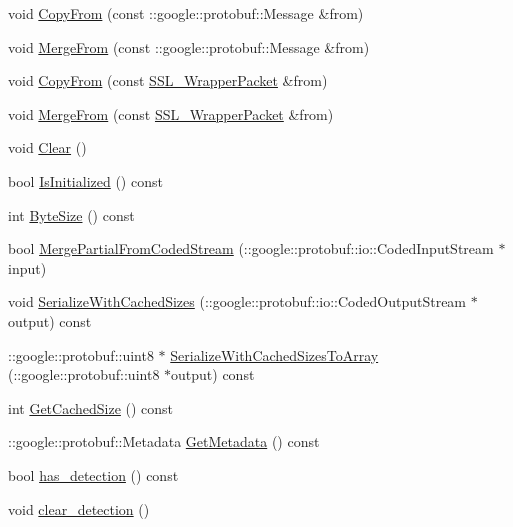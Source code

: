 \begin{DoxyCompactItemize}
\item 
void \hyperlink{class_s_s_l___wrapper_packet_a3598bad0c735e7936e1e8bfbe7ce1139}{Copy\-From} (const \-::google\-::protobuf\-::\-Message \&from)
\item 
void \hyperlink{class_s_s_l___wrapper_packet_ad83ac8173a8de6b17e3a27ae9d25594a}{Merge\-From} (const \-::google\-::protobuf\-::\-Message \&from)
\item 
void \hyperlink{class_s_s_l___wrapper_packet_a91e54235d684a97ae9cc27e499440466}{Copy\-From} (const \hyperlink{class_s_s_l___wrapper_packet}{S\-S\-L\-\_\-\-Wrapper\-Packet} \&from)
\item 
void \hyperlink{class_s_s_l___wrapper_packet_a98cd44b6a6067c67fbc8bed126e3f3e8}{Merge\-From} (const \hyperlink{class_s_s_l___wrapper_packet}{S\-S\-L\-\_\-\-Wrapper\-Packet} \&from)
\item 
void \hyperlink{class_s_s_l___wrapper_packet_aed15545de01822088f86589e1581a7aa}{Clear} ()
\item 
bool \hyperlink{class_s_s_l___wrapper_packet_a9d21830755ed4faf4423ffe80c5e459e}{Is\-Initialized} () const 
\item 
int \hyperlink{class_s_s_l___wrapper_packet_a0d5471e98f9b7f844cfc9e843f94cbfc}{Byte\-Size} () const 
\item 
bool \hyperlink{class_s_s_l___wrapper_packet_ac992de93a5bea8ef181929c7e6c90365}{Merge\-Partial\-From\-Coded\-Stream} (\-::google\-::protobuf\-::io\-::\-Coded\-Input\-Stream $\ast$input)
\item 
void \hyperlink{class_s_s_l___wrapper_packet_a697badddd172e1ecbfc9d58be38f94e4}{Serialize\-With\-Cached\-Sizes} (\-::google\-::protobuf\-::io\-::\-Coded\-Output\-Stream $\ast$output) const 
\item 
\-::google\-::protobuf\-::uint8 $\ast$ \hyperlink{class_s_s_l___wrapper_packet_aff5f66836b5a85ea6396343cd53d4826}{Serialize\-With\-Cached\-Sizes\-To\-Array} (\-::google\-::protobuf\-::uint8 $\ast$output) const 
\item 
int \hyperlink{class_s_s_l___wrapper_packet_af8246e95a4270565203e3a2312a19437}{Get\-Cached\-Size} () const 
\item 
\-::google\-::protobuf\-::\-Metadata \hyperlink{class_s_s_l___wrapper_packet_a9f489558e070ea38a3bd4c3992a4e470}{Get\-Metadata} () const 
\item 
bool \hyperlink{class_s_s_l___wrapper_packet_ad95e2fcb3df9e634537f16bf4b04a7ac}{has\-\_\-detection} () const 
\item 
void \hyperlink{class_s_s_l___wrapper_packet_aa3576bdf08d3aeafa7b71792696e200e}{clear\-\_\-detection} ()

\end{DoxyCompactItemize}
